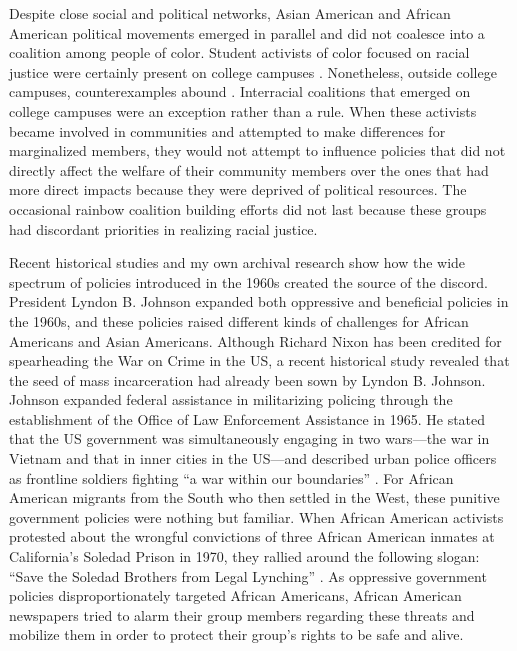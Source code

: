 \documentclass[12 pt]{article}
\begin{document}
Despite close social and political networks, Asian American and African American political movements emerged in parallel and did not coalesce into a coalition among people of color. Student activists of color focused on racial justice were certainly present on college campuses \citep{umemoto1989strike, wei_asian_1993, maeda2012rethinking}. Nonetheless, outside college campuses, counterexamples abound \citep[238-240]{brilliant2010color}. Interracial coalitions that emerged on college campuses were an exception rather than a rule. When these activists became involved in communities and attempted to make differences for marginalized members, they would not attempt to influence policies that did not directly affect the welfare of their community members over the ones that had more direct impacts because they were deprived of political resources. The occasional rainbow coalition building efforts did not last because these groups had discordant priorities in realizing racial justice.

Recent historical studies and my own archival research show how the wide spectrum of policies introduced in the 1960s created the source of the discord. President Lyndon B. Johnson expanded both oppressive and beneficial policies in the 1960s, and these policies raised different kinds of challenges for African Americans and Asian Americans. Although Richard Nixon has been credited for spearheading the War on Crime in the US, a recent historical study revealed that the seed of mass incarceration had already been sown by Lyndon B. Johnson. Johnson expanded federal assistance in militarizing policing through the establishment of the Office of Law Enforcement Assistance in 1965. He stated that the US government was simultaneously engaging in two wars---the war in Vietnam and that in inner cities in the US---and described urban police officers as frontline soldiers fighting “a war within our boundaries” \citep[102-105]{hinton2015war}. For African American migrants from the South who then settled in the West, these punitive government policies were nothing but familiar. When African American activists protested about the wrongful convictions of three African American inmates at California's Soledad Prison in 1970, they rallied around the following slogan: “Save the Soledad Brothers from Legal Lynching” \citep{davis1971soledad}. As oppressive government policies disproportionately targeted African Americans, African American newspapers tried to alarm their group members regarding these threats and mobilize them in order to protect their group's rights to be safe and alive. 
\end{document}

